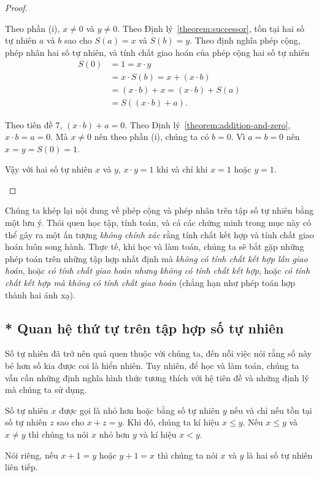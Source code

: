 \begin{proof}
\begin{enumerate}[label={(\roman*)}]
              Theo phần (i), $x\ne 0$ và $y\ne 0$. Theo Định lý~\ref{theorem:successor}, tồn tại hai số tự nhiên $a$ và $b$ sao cho $S(a) = x$ và $S(b) = y$. Theo định nghĩa phép cộng, phép nhân hai số tự nhiên, và tính chất giao hoán của phép cộng hai số tự nhiên
              \begin{align*}
                  S(0) & = 1 = x\cdot y                       \\
                       & = x\cdot S(b) = x + (x\cdot b)       \\
                       & = (x\cdot b) + x = (x\cdot b) + S(a) \\
                       & = S((x\cdot b) + a).
              \end{align*}

              Theo tiên đề 7, $(x\cdot b) + a = 0$. Theo Định lý~\ref{theorem:addition-and-zero}, $x\cdot b = a = 0$. Mà $x\ne 0$ nên theo phần (i), chúng ta có $b = 0$. Vì $a = b = 0$ nên $x = y = S(0) = 1$.

              Vậy với hai số tự nhiên $x$ và $y$, $x\cdot y = 1$ khi và chỉ khi $x = 1$ hoặc $y = 1$.
    \end{enumerate}
\end{proof}

Chúng ta khép lại nội dung về phép cộng và phép nhân trên tập số tự nhiên bằng một lưu ý. Thói quen học tập, tính toán, và cả các chứng minh trong mục này có thể gây ra một ấn tượng \textit{không chính xác} rằng tính chất kết hợp và tính chất giao hoán luôn song hành. Thực tế, khi học và làm toán, chúng ta sẽ bắt gặp những phép toán trên những tập hợp nhất định mà \textit{không có tính chất kết hợp lẫn giao hoán}, hoặc \textit{có tính chất giao hoán nhưng không có tính chất kết hợp}, hoặc \textit{có tính chất kết hợp mà không có tính chất giao hoán} (chẳng hạn như phép toán hợp thành hai ánh xạ).

\subsection{* Quan hệ thứ tự trên tập hợp số tự nhiên}

Số tự nhiên đã trở nên quá quen thuộc với chúng ta, đến nỗi việc nói rằng số này bé hơn số kia được coi là hiển nhiên. Tuy nhiên, để học và làm toán, chúng ta vẫn cần những định nghĩa hình thức tương thích với hệ tiên đề và những định lý mà chúng ta sử dụng.

\begin{definition}
    Số tự nhiên $x$ được gọi là nhỏ hơn hoặc bằng số tự nhiên $y$ nếu và chỉ nếu tồn tại số tự nhiên $z$ sao cho $x + z = y$. Khi đó, chúng ta kí hiệu $x\leq y$. Nếu $x\leq y$ và $x\ne y$ thì chúng ta nói $x$ nhỏ hơn $y$ và kí hiệu $x < y$.

    Nói riêng, nếu $x + 1 = y$ hoặc $y + 1 = x$ thì chúng ta nói $x$ và $y$ là hai số tự nhiên liên tiếp.
\end{definition}

